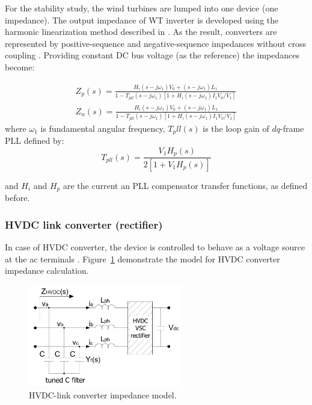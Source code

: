 \documentclass[12pt]{report} %
\begin{document}
For the stability study, the wind turbines are lumped into one device (one impedance). The output impedance of WT inverter is developed using the harmonic linearization method described in \cite{bing2009}. As the result, converters are represented by positive-sequence and negative-sequence impedances without cross coupling \cite{cespedes2014}. Providing constant DC bus voltage (as the reference) the impedances become:

\begin{equation} \label{eq:impedance_wt}
\begin{aligned}
	Z_p (s)=\frac{H_i (s-j\omega_1)V_0 +(s-j\omega_1)L_1 }{1-T_{pll} (s-j\omega_1)[1+H_i (s-j\omega_1)I_1 V_0 /V_1 ]} \\
	Z_n (s)=\frac{H_i (s-j\omega_1)V_0 +(s-j\omega_1)L_1 }{1-T_{pll} (s-j\omega_1)[1+H_i (s-j\omega_1)I_1 V_0 /V_1 ]}
\end{aligned}
\end{equation}
where $\omega_1$ is fundamental angular frequency, $T_pll (s)$ is the loop gain of $dq$-frame PLL defined by:
\begin{equation}
	T_{pll} (s)=\dfrac{V_1 H_p (s)}{2[1+V_1 H_p (s)]}
\end{equation}

and $H_i$ and $H_p$ are the current an PLL compensator transfer functions, as defined before.

\subsubsection{HVDC link converter (rectifier)}
In case of HVDC converter, the device is controlled to behave as a voltage source at the ac terminals \cite{larsen2012}. Figure~\ref{fig:hvdcscheme} demonstrate the model for HVDC converter impedance calculation.

\begin{figure}[htb]
	\centering
    	\includegraphics[width=0.6\textwidth]{img/theory/HVDC_scheme.png}
  	\caption{HVDC-link converter impedance model.}
  	\label{fig:hvdcscheme}
\end{figure}
\FloatBarrier
\end{document}
